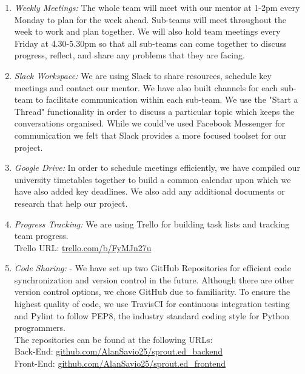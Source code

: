 \documentclass{article}
\begin{document}
\begin{enumerate}
    \setlength\itemsep{0em}
    \item \textit{Weekly Meetings:} The whole team will meet with our mentor at 1-2pm every Monday to plan for the week ahead. Sub-teams will meet throughout the week to work and plan together. We will also hold team meetings every Friday at 4.30-5.30pm so that all sub-teams can come together to discuss progress, reflect, and share any problems that they are facing.
    \item \textit{Slack Workspace:} We are using Slack to share resources, schedule key meetings and contact our mentor. We have also built channels for each sub-team to facilitate communication within each sub-team. We use the "Start a Thread" functionality in order to discuss a particular topic which keeps the conversations organised. While we could've used Facebook Messenger for communication we felt that Slack provides a more focused toolset for our project.
    \item \textit{Google Drive:} In order to schedule meetings efficiently, we have compiled our university timetables together to build a common calendar upon which we have also added key deadlines. We also add any additional documents or research that help our project. 
    \item \textit{Progress Tracking:} We are using Trello for building task lists and tracking team progress. \\ Trello URL: \href{https://trello.com/b/FyMJn27u}{trello.com/b/FyMJn27u}
    \item \textit{Code Sharing:} - We have set up two GitHub Repositories for efficient code synchronization and version control in the future. Although there are other version control options, we chose GitHub due to familiarity. To ensure the highest quality of code, we use TravisCI for continuous integration testing and Pylint to follow PEP8, the industry standard coding style for Python programmers. \\
    The repositories can be found at the following URLs: \\
    Back-End: \href{https://github.com/AlanSavio25/sprout.ed\_backend}{github.com/AlanSavio25/sprout.ed\_backend} \\
    Front-End: \href{https://github.com/AlanSavio25/sprout.ed\_frontend}{github.com/AlanSavio25/sprout.ed\_frontend} 
    
\end{enumerate}
\end{document}
